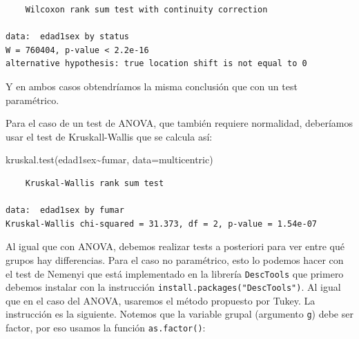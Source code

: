 \documentclass[
]{book}
\newenvironment{Shaded}{\begin{snugshade}}{\end{snugshade}}
\newcommand{\AttributeTok}[1]{\textcolor[rgb]{0.77,0.63,0.00}{#1}}
\newcommand{\FunctionTok}[1]{\textcolor[rgb]{0.00,0.00,0.00}{#1}}
\newcommand{\NormalTok}[1]{#1}
\newcommand{\OtherTok}[1]{\textcolor[rgb]{0.56,0.35,0.01}{#1}}
\newcommand{\SpecialCharTok}[1]{\textcolor[rgb]{0.00,0.00,0.00}{#1}}
\newcommand{\StringTok}[1]{\textcolor[rgb]{0.31,0.60,0.02}{#1}}
\begin{document}
\begin{verbatim}
    Wilcoxon rank sum test with continuity correction

data:  edad1sex by status
W = 760404, p-value < 2.2e-16
alternative hypothesis: true location shift is not equal to 0
\end{verbatim}

Y en ambos casos obtendríamos la misma conclusión que con un test paramétrico.

Para el caso de un test de ANOVA, que también requiere normalidad, deberíamos usar el test de Kruskall-Wallis que se calcula así:

\begin{Shaded}
\begin{Highlighting}[]
\FunctionTok{kruskal.test}\NormalTok{(edad1sex}\SpecialCharTok{\textasciitilde{}}\NormalTok{fumar, }\AttributeTok{data=}\NormalTok{multicentric)}
\end{Highlighting}
\end{Shaded}

\begin{verbatim}
    Kruskal-Wallis rank sum test

data:  edad1sex by fumar
Kruskal-Wallis chi-squared = 31.373, df = 2, p-value = 1.54e-07
\end{verbatim}

Al igual que con ANOVA, debemos realizar tests a posteriori para ver entre qué grupos hay differencias. Para el caso no paramétrico, esto lo podemos hacer con el test de Nemenyi que está implementado en la librería \texttt{DescTools} que primero debemos instalar con la instrucción \texttt{install.packages("DescTools")}. Al igual que en el caso del ANOVA, usaremos el método propuesto por Tukey. La instrucción es la siguiente. Notemos que la variable grupal (argumento \texttt{g}) debe ser factor, por eso usamos la función \texttt{as.factor()}:

\begin{Shaded}
\end{Shaded}
\end{document}
